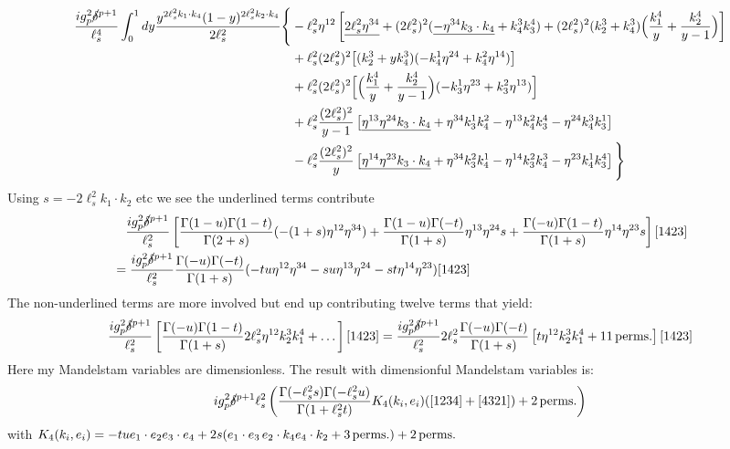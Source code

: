 \documentclass[11pt, class=article, crop=false]{standalone}
\begin{document}
\begin{enumerate}
	\begin{equation}\label{eq:gauge}
	\begin{aligned}
		\frac{i g_p^2 \cancel\delta^{p+1}}{\ell_s^4} \int_0^1 dy \frac{y^{2 \ell_s^2 k_1 \cdot k_4} (1-y)^{2 \ell_s^2 k_2 \cdot k_4}}{2 \ell_s^2}
		 \Bigg\{
		& -\ell_s^2 \eta^{12} 
		 \left[ \underline{2 \ell_s^2 \eta^{34}} + (2 \ell_s^2)^2 (\underline{-\eta^{34} k_3 \cdot k_4} + k_4^3 k_3^4) + (2\ell_s^2)^2 (k_2^3 + k_4^3) \Big(\frac{k_1^4}{y} + \frac{k_2^4}{y-1}\Big) \right]\\
		& + \ell_s^2 (2 \ell_s^2)^2 
		\big[(k_2^3 + y k_4^3)(-k_4^1 \eta^{24} + k_4^2 \eta^{14}) \big] 
		\\ & + \ell_s^2 (2 \ell_s^2)^2 
		\Big[\Big(\frac{k_1^4}{y} + \frac{k_2^4}{y-1} \Big) (-k_3^1 \eta^{23} + k_3^2 \eta^{13}) \Big]\\
		& + \ell_s^2 \frac{(2 \ell_s^2)^2}{y-1} 
		\left[\underline{\eta^{13} \eta^{24} k_3 \cdot k_4} + \eta^{34} k_3^1 k_4^2 - \eta^{13} k_4^2 k_3^4 - \eta^{24} k_4^3 k_3^1 \right]\\
		& - \ell_s^2 \frac{(2 \ell_s^2)^2}{y} 
		\left[\underline{\eta^{14} \eta^{23} k_3 \cdot k_4 }+ \eta^{34} k_3^2 k_4^1 - \eta^{14} k_3^2 k_4^3 - \eta^{23} k_4^1 k_3^4 \right]  \Bigg\}
	\end{aligned}		
	\end{equation}
	Using $s = -2 \ell_s^2 k_1 \cdot k_2$ etc we see the underlined terms contribute
	\[
	\begin{aligned}
		& \quad \frac{i g_p^2 \cancel\delta^{p+1}}{\ell_s^2} \left[\frac{\Gamma(1-u) \Gamma(1-t)}{\Gamma(2+s)} (-(1 + s) \eta^{12} \eta^{34}) + \frac{\Gamma(1-u) \Gamma(-t)}{\Gamma(1+s)} \eta^{13} \eta^{24} s + \frac{\Gamma(-u) \Gamma(1-t)}{\Gamma(1+s)} \eta^{14} \eta^{23} s \right][1423]\\
		& = \frac{i g_p^2 \cancel\delta^{p+1}}{\ell_s^2} \frac{\Gamma(-u) \Gamma(-t)}{\Gamma(1+s)} ( - tu \eta^{12} \eta^{34} - su \eta^{13} \eta^{24} - st \eta^{14} \eta^{23} ) [1423]
	\end{aligned}
	\]
	The non-underlined terms are more involved but end up contributing twelve terms that yield:
	\[
	\begin{aligned}
		& \quad \frac{i g_p^2 \cancel\delta^{p+1}}{\ell_s^2} \left[\frac{\Gamma(-u) \Gamma(1-t)}{\Gamma(1+s)} 2 \ell_s^2 \eta^{12} k_2^3 k_1^4 + \dots \right][1423] = \frac{i g_p^2 \cancel\delta^{p+1}}{\ell_s^2} 2 \ell_s^2 \frac{\Gamma(-u) \Gamma(-t)}{\Gamma(1+s)} \left[ t \eta^{12} k_2^3 k_1^4 + 11 \,\mathrm{perms.} \right][1423]
	\end{aligned}
	\]
	Here my Mandelstam variables are dimensionless. The result with dimensionful Mandelstam variables is:
	\begin{equation}\label{eq:4gluons}
		i g_p^2 \cancel\delta^{p+1} \ell_s^2  \left( \frac{\Gamma(-\ell_s^2 s) \Gamma( -\ell_s^2 u)}{\Gamma(1 + \ell_s^2 t)} K_4(k_i, e_i) ([1234] + [4321]) + 2 \,\mathrm{perms.}\right)
	\end{equation}
	with $K_4 (k_i, e_i) = - t u e_1 \cdot e_2 e_3 \cdot e_4 + 2 s (e_1 \cdot e_3 \, e_2 \cdot k_4 e_4 \cdot k_2 + 3 \,\mathrm{perms.} )  + 2 \,\mathrm{perms.}$
	

\end{enumerate}
\end{document}
